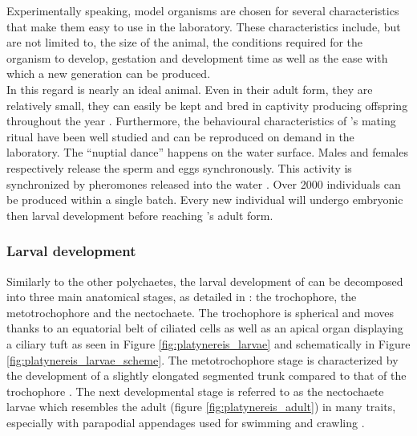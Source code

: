      Experimentally speaking, model organisms are chosen for several characteristics that make them easy to use in the laboratory. These characteristics include, but are not limited to, the size of the animal, the conditions required for the organism to develop, gestation and development time as well as the ease with which a new generation can be produced.\\
     
     In this regard \platy{} is nearly an ideal animal. Even in their adult form, they are relatively small, they can easily be kept and bred in captivity producing offspring throughout the year \citep{fischer04}. Furthermore, the behavioural characteristics of \platy{}'s mating ritual have been well studied and can be reproduced on demand in the laboratory. The ``nuptial dance'' happens on the water surface. Males and females respectively release the sperm and eggs synchronously. This activity is synchronized by pheromones released into the water \citep{zeeck98}. Over 2000 individuals can be produced within a single batch. Every new individual will undergo embryonic then larval development before reaching \platy{}'s adult form.\\

 
    	 \subsubsection{Larval development}
    Similarly to the other polychaetes, the larval development of \platy{} can be decomposed into three main anatomical stages, as detailed in \citep{hauenschild69}: the trochophore, the metotrochophore and the nectochaete. The trochophore is spherical and moves thanks to an equatorial belt of ciliated cells as well as an apical organ displaying a ciliary tuft \citep{rouse99,nielsen04} as seen in Figure \ref{fig:platynereis_larvae} and schematically in Figure \ref{fig:platynereis_larvae_scheme}. The metotrochophore stage is characterized by the development of a slightly elongated segmented trunk compared to that of the trochophore \citep{hacker98}. The next developmental stage is referred to as the nectochaete larvae which resembles the adult (figure \ref{fig:platynereis_adult}) in many traits, especially with parapodial appendages used for swimming and crawling \citep{hacker98}.\\
    
